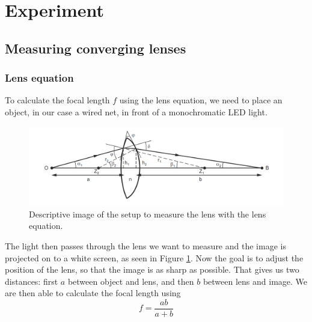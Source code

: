 \section{Experiment}

\subsection{Measuring converging lenses}
\subsubsection{Lens equation}
\label{chap::lens}

To calculate the focal length $f$ using the lens equation, we need to place an object, in our case a wired net, in front of a monochromatic LED light. 

\begin{figure}[ht]
	\centering
	\includegraphics[width=\textwidth]{img/lenseq.PNG}
	\caption{Descriptive image\cite{manual} of the setup to measure the lens with the lens equation.}
	\label{fig::lens}
\end{figure}

The light then passes through the lens we want to measure and the image is projected on to a white screen, as seen in Figure \ref{fig::lens}.
Now the goal is to adjust the position of the lens, so that the image is as sharp as possible.
That gives us two distances:
first $a$ between object and lens, and then $b$ between lens and image.
We are then able to calculate the focal length using
\begin{equation}
	\displaystyle f = \frac{ab}{a+b}
\end{equation}





